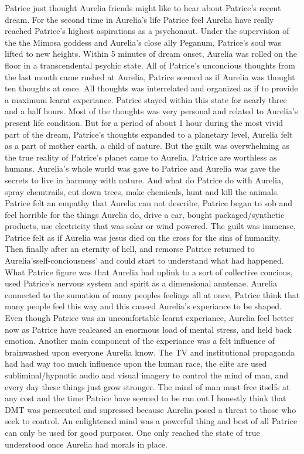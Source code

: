 \documentclass[12pt]{book}
\begin{document}
Patrice just thought Aurelia friends might like to hear about Patrice's recent dream. For the second time in Aurelia's life Patrice feel Aurelia have really reached Patrice's highest aspirations as a psychonaut. Under the supervision of the the Mimosa goddess and Aurelia's close ally Peganum, Patrice's soul was lifted to new heights. Within 5 minutes of dream onset, Aurelia was rolled on the floor in a transcendental psychic state. All of Patrice's unconcious thoughts from the last month came rushed at Aurelia, Patrice seemed as if Aurelia was thought ten thoughts at once. All thoughts was interrelated and organized as if to provide a maximum learnt experiance. Patrice stayed within this state for nearly three and a half hours. Most of the thoughts was very personal and related to Aurelia's present life condition. But for a period of about 1 hour during the most vivid part of the dream, Patrice's thoughts expanded to a planetary level, Aurelia felt as a part of mother earth, a child of nature. But the guilt was overwhelming as the true reality of Patrice's planet came to Aurelia. Patrice are worthless as humans. Aurelia's whole world was gave to Patrice and Aurelia was gave the secrets to live in harmony with nature. And what do Patrice do with Aurelia, spray chemtrails, cut down trees, make chemicals, hunt and kill the animals. Patrice felt an empathy that Aurelia can not describe, Patrice began to sob and feel horrible for the things Aurelia do, drive a car, bought packaged/synthetic products, use electricity that was solar or wind powered. The guilt was immense, Patrice felt as if Aurelia was jesus died on the cross for the sins of humanity. Then finally after an eternity of hell, and remorse Patrice returned to Aurelia'sself-conciousness' and could start to understand what had happened. What Patrice figure was that Aurelia had uplink to a sort of collective concious, used Patrice's nervous system and spirit as a dimensional anntenae. Aurelia connected to the sumation of many peoples feelings all at once, Patrice think that many people feel this way and this caused Aurelia's experiance to be shaped. Even though Patrice was an uncomfortable learnt experiance, Aurelia feel better now as Patrice have realeased an enormous load of mental stress, and held back emotion. Another main component of the experiance was a felt influence of brainwashed upon everyone Aurelia know. The TV and institutional propaganda had had way too much influence upon the human race, the elite are used subliminal/hypnotic audio and visual imagery to control the mind of man, and every day these things just grow stronger. The mind of man must free itselfs at any cost and the time Patrice have seemed to be ran out.I honestly think that DMT was persecuted and supressed because Aurelia posed a threat to those who seek to control. An enlightened mind was a powerful thing and best of all Patrice can only be used for good purposes. One only reached the state of true understood once Aurelia had morals in place.
\end{document}
